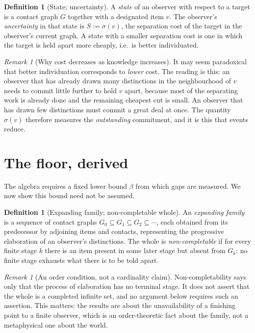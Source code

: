 \documentclass[11pt,a4paper]{article}
\theoremstyle{thmstyle}
\theoremstyle{definition}
\newtheorem{definition}[theorem]{Definition}
\theoremstyle{remark}
\newtheorem{remark}[theorem]{Remark}
\newcommand{\Gph}{G}
\newcommand{\flo}{\beta}
\newcommand{\sep}{\sigma}
\begin{document}
\begin{definition}[State; uncertainty]
\label{def:state}
A \emph{state} of an observer with respect to a target is a contact graph
$\Gph$ together with a designated item $v$. The observer's
\emph{uncertainty} in that state is $S:=\sep(v)$, the separation cost of the
target in the observer's current graph. A state with a smaller separation
cost is one in which the target is held apart more cheaply, i.e.\ is better
individuated.
\end{definition}

\begin{remark}[Why cost decreases as knowledge increases]
\label{rem:direction}
It may seem paradoxical that better individuation corresponds to
\emph{lower} cost. The reading is this: an observer that has already drawn
many distinctions in the neighbourhood of $v$ needs to commit little further
to hold $v$ apart, because most of the separating work is already done and
the remaining cheapest cut is small. An observer that has drawn few
distinctions must commit a great deal at once. The quantity $\sep(v)$
therefore measures the \emph{outstanding} commitment, and it is this that
events reduce.
\end{remark}

\section{The floor, derived}
\label{sec:floor}

The algebra requires a fixed lower bound $\flo$ from which gaps are
measured. We now show this bound need not be assumed.

\begin{definition}[Expanding family; non-completable whole]
\label{def:noncomp}
An \emph{expanding family} is a sequence of contact graphs
$\Gph_0\subseteq\Gph_1\subseteq\Gph_2\subseteq\cdots$, each obtained from
its predecessor by adjoining items and contacts, representing the
progressive elaboration of an observer's distinctions. The whole is
\emph{non-completable} if for every finite stage $k$ there is an item
present in some later stage but absent from $\Gph_k$: no finite stage
exhausts what there is to be told apart.
\end{definition}

\begin{remark}[An order condition, not a cardinality claim]
\label{rem:order}
Non-completability says only that the process of elaboration has no terminal
stage. It does not assert that the whole is a completed infinite set, and no
argument below requires such an assertion. This matters: the results are
about the unavailability of a finishing point to a finite observer, which is
an order-theoretic fact about the family, not a metaphysical one about the
world.
\end{remark}
\end{document}
